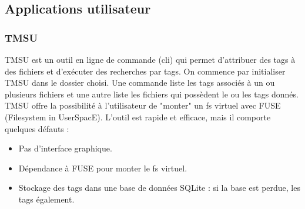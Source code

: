 \documentclass[a4paper, 12pt]{article}
\begin{document}
\subsection{Applications utilisateur}
\subsubsection{TMSU}
TMSU \cite{ref15} est un outil en ligne de commande (\acrshort{cli}) qui permet d'attribuer des tags à des 
fichiers et d'exécuter des recherches par tags. On commence par initialiser TMSU dans le dossier choisi. 
Une commande liste les tags associés à un ou 
plusieurs fichiers et une autre liste les fichiers qui possèdent le ou les tags donnés. TMSU offre 
la possibilité à l'utilisateur de "monter" un \acrshort{fs} virtuel avec FUSE (Filesystem in 
UserSpacE). L'outil est rapide et efficace, mais il comporte quelques défauts :
\begin{itemize}
    \item Pas d'interface graphique.
    \item Dépendance à FUSE pour monter le \acrshort{fs} virtuel.
    \item Stockage des tags dans une base de données SQLite : si la base est perdue, les tags également.
\end{itemize}
\end{document}
